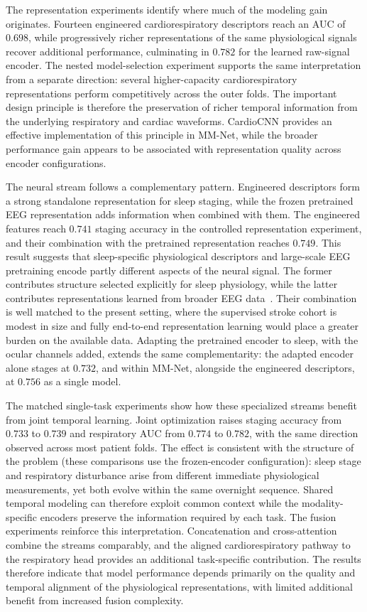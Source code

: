 \documentclass{ieeeaccess}
\newcommand{\mmAccS}{0.756}
\begin{document}
The representation experiments identify where much of the modeling gain
originates. Fourteen engineered cardiorespiratory descriptors reach an AUC of
$0.698$, while progressively richer representations of the same physiological
signals recover additional performance, culminating in $0.782$ for the learned
raw-signal encoder. The nested model-selection experiment supports the same
interpretation from a separate direction: several higher-capacity
cardiorespiratory representations perform competitively across the outer
folds. The important design principle is therefore the preservation of richer
temporal information from the underlying respiratory and cardiac waveforms.
CardioCNN provides an effective implementation of this principle in MM-Net, while the broader performance gain appears to be associated with representation quality across encoder configurations.

The neural stream follows a complementary pattern. Engineered descriptors form
a strong standalone representation for sleep staging, while the frozen
pretrained EEG representation adds information when combined with them. The
engineered features reach $0.741$ staging accuracy in the controlled
representation experiment, and their combination with the pretrained
representation reaches $0.749$. This result suggests that sleep-specific
physiological descriptors and large-scale EEG pretraining encode partly
different aspects of the neural signal. The former contributes structure
selected explicitly for sleep physiology, while the latter contributes
representations learned from broader EEG data~\cite{labram2024}. Their
combination is well matched to the present setting, where the supervised stroke
cohort is modest in size and fully end-to-end representation learning would
place a greater burden on the available data. Adapting the pretrained encoder to sleep, with
the ocular channels added, extends the same complementarity: the adapted encoder alone stages
at $0.732$, and within MM-Net, alongside the engineered descriptors, at $\mmAccS$ as a single
model.

The matched single-task experiments show how these specialized streams benefit
from joint temporal learning. Joint optimization raises staging accuracy from
$0.733$ to $0.739$ and respiratory AUC from $0.774$ to $0.782$, with the same
direction observed across most patient folds. The effect is consistent with the
structure of the problem (these comparisons use the frozen-encoder configuration): sleep
stage and respiratory disturbance arise from
different immediate physiological measurements, yet both evolve within the
same overnight sequence. Shared temporal modeling can therefore exploit common
context while the modality-specific encoders preserve the information required
by each task. The fusion experiments reinforce this interpretation. Concatenation and
cross-attention combine the streams comparably, and the aligned cardiorespiratory pathway to
the respiratory head provides an additional task-specific contribution. The results therefore indicate that model performance depends primarily on the quality and temporal alignment of the physiological representations, with limited additional benefit from increased fusion complexity.
\end{document}
